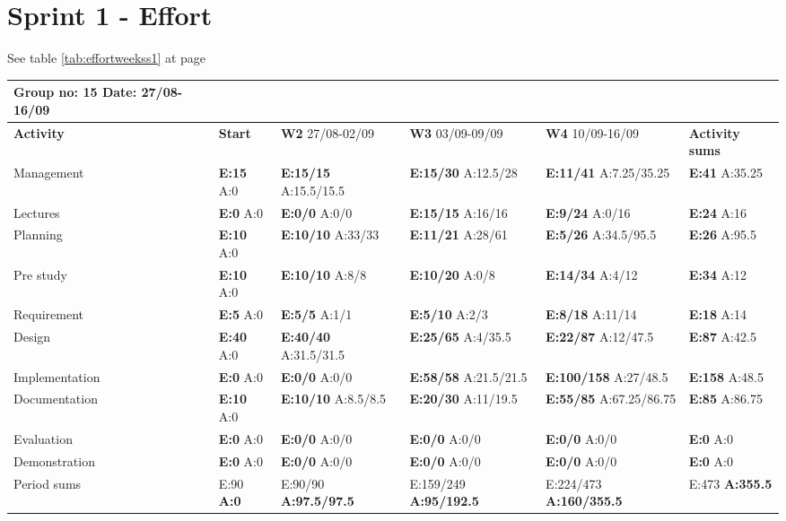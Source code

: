\section{Sprint 1 - Effort}

See table \ref{tab:effortweekss1} at page \pageref{tab:effortweekss1}
\begin{table}
\begin{tabularx}{\linewidth}{>{\setlength\hsize{.625\hsize}}X|>{\setlength\hsize{0.3\hsize}}X|>{\setlength\hsize{0.5\hsize}}X|>{\setlength\hsize{0.5\hsize}}X|>{\setlength\hsize{0.5\hsize}}X|>{\setlength\hsize{.3\hsize}}X}
Group no: 15 Date: 27/08-16/09  \\ \hline
\textbf{Activity} & \textbf{Start} & \textbf{W2} 27/08-02/09 & \textbf{W3} 03/09-09/09 & \textbf{W4} 10/09-16/09 & \textbf{Activity sums} \\ \hline \hline
Management & \textbf{E:15} A:0 & \textbf{E:15/15} A:15.5/15.5 & \textbf{E:15/30} A:12.5/28 & \textbf{E:11/41} A:7.25/35.25 & \textbf{E:41} A:35.25  \\ \hline
Lectures & \textbf{E:0} A:0 & \textbf{E:0/0} A:0/0 & \textbf{E:15/15} A:16/16 & \textbf{E:9/24} A:0/16 & \textbf{E:24 } A:16  \\ \hline
Planning & \textbf{E:10} A:0 & \textbf{E:10/10} A:33/33 & \textbf{E:11/21} A:28/61 & \textbf{E:5/26} A:34.5/95.5 & \textbf{E:26 } A:95.5  \\ \hline
Pre study & \textbf{E:10} A:0 & \textbf{E:10/10} A:8/8 & \textbf{E:10/20} A:0/8 & \textbf{E:14/34} A:4/12 & \textbf{E:34 } A:12  \\ \hline
Requirement & \textbf{E:5} A:0 & \textbf{E:5/5} A:1/1 & \textbf{E:5/10} A:2/3 & \textbf{E:8/18} A:11/14 & \textbf{E:18 } A:14  \\ \hline
Design & \textbf{E:40} A:0 & \textbf{E:40/40} A:31.5/31.5 & \textbf{E:25/65} A:4/35.5 & \textbf{E:22/87} A:12/47.5 & \textbf{E:87 } A:42.5  \\ \hline
Implementation & \textbf{E:0} A:0 & \textbf{E:0/0} A:0/0 & \textbf{E:58/58} A:21.5/21.5 & \textbf{E:100/158} A:27/48.5 & \textbf{E:158 } A:48.5  \\ \hline
Documentation & \textbf{E:10} A:0 & \textbf{E:10/10} A:8.5/8.5 & \textbf{E:20/30} A:11/19.5 & \textbf{E:55/85} A:67.25/86.75 & \textbf{E:85 } A:86.75  \\ \hline
Evaluation & \textbf{E:0} A:0 & \textbf{E:0/0} A:0/0 & \textbf{E:0/0} A:0/0 & \textbf{E:0/0} A:0/0 & \textbf{E:0 } A:0  \\ \hline
Demonstration & \textbf{E:0} A:0 & \textbf{E:0/0} A:0/0 & \textbf{E:0/0} A:0/0 & \textbf{E:0/0} A:0/0 & \textbf{E:0 } A:0  \\ \hline
Period sums & E:90 \textbf{A:0} & E:90/90 \textbf{A:97.5/97.5} & E:159/249 \textbf{A:95/192.5} & E:224/473 \textbf{A:160/355.5} & E:473 \textbf{A:355.5}
\end{tabularx}


\end{table}
